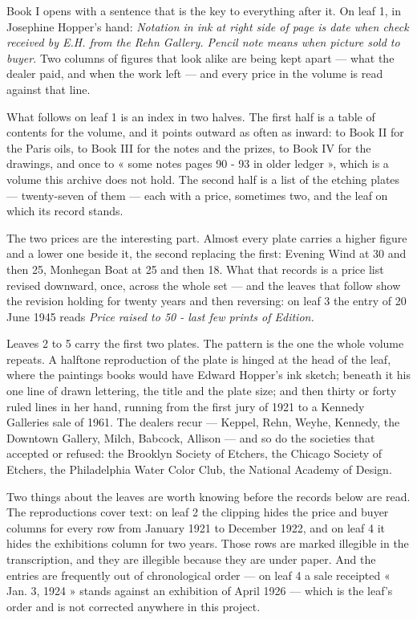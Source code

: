 \documentclass[11pt,a4paper]{article}
\begin{document}
\begin{summary}
Book I opens with a sentence that is the key to everything after it. On leaf 1,
in Josephine Hopper's hand: \emph{Notation in ink at right side of page is date
when check received by E.H. from the Rehn Gallery. Pencil note means when
picture sold to buyer.} Two columns of figures that look alike are being kept
apart --- what the dealer paid, and when the work left --- and every price in
the volume is read against that line.

What follows on leaf 1 is an index in two halves. The first half is a table of
contents for the volume, and it points outward as often as inward: to Book II
for the Paris oils, to Book III for the notes and the prizes, to Book IV for
the drawings, and once to « some notes pages 90 - 93 in older ledger », which
is a volume this archive does not hold. The second half is a list of the
etching plates --- twenty-seven of them --- each with a price, sometimes two,
and the leaf on which its record stands.

The two prices are the interesting part. Almost every plate carries a higher
figure and a lower one beside it, the second replacing the first: Evening Wind
at 30 and then 25, Monhegan Boat at 25 and then 18. What that records is a
price list revised downward, once, across the whole set --- and the leaves that
follow show the revision holding for twenty years and then reversing: on leaf 3
the entry of 20 June 1945 reads \emph{Price raised to 50 - last few prints of
Edition.}

Leaves 2 to 5 carry the first two plates. The pattern is the one the whole
volume repeats. A halftone reproduction of the plate is hinged at the head of
the leaf, where the paintings books would have Edward Hopper's ink sketch;
beneath it his one line of drawn lettering, the title and the plate size; and
then thirty or forty ruled lines in her hand, running from the first jury of
1921 to a Kennedy Galleries sale of 1961. The dealers recur --- Keppel, Rehn,
Weyhe, Kennedy, the Downtown Gallery, Milch, Babcock, Allison --- and so do the
societies that accepted or refused: the Brooklyn Society of Etchers, the
Chicago Society of Etchers, the Philadelphia Water Color Club, the National
Academy of Design.

Two things about the leaves are worth knowing before the records below are
read. The reproductions cover text: on leaf 2 the clipping hides the price and
buyer columns for every row from January 1921 to December 1922, and on leaf 4
it hides the exhibitions column for two years. Those rows are marked illegible
in the transcription, and they are illegible because they are under paper. And
the entries are frequently out of chronological order --- on leaf 4 a sale
receipted « Jan. 3, 1924 » stands against an exhibition of April 1926 --- which
is the leaf's order and is not corrected anywhere in this project.


\end{summary}
\end{document}
